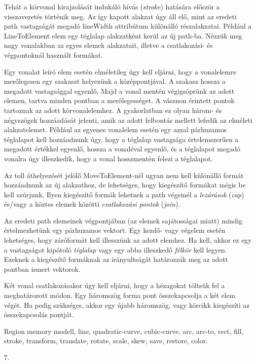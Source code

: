 \documentclass[12pt]{report}
\theoremstyle{definition}
\newcommand{\inenglish}[1]{\textsl{#1}}
\newcommand{\func}[1]{{\textsf{\footnotesize{#1}}}}
\begin{document}
Tehát a körvonal kirajzolását indukáló hívás (\emph{stroke}) hatására először a
visszavezetés történik meg. Az így kapott alakzat úgy áll elő, mint az eredeti
path vastagságát megadó \func{lineWidth} attribútum különálló részalakzatai.
Például a \func{LineToElement} elem egy téglalap alakzatként kerül az új
path-ba. Nézzük meg nagy vonalakban az egyes elemek alakzatait, illetve a
csatlakozási- és végpontoknál használt formákat.

Egy vonalat leíró elem esetén elméletileg úgy kell eljárni, hogy a vonalelemre
merőlegesen egy szakaszt helyezünk a középpontjával. A szakasz hossza a
megadott vastagsággal egyenlő. Majd a vonal mentén végigsöprünk az adott
elemen, tartva minden pontban a merőlegességet. A vásznon érintett pontok
tartoznak az adott körvonalelemhez. A gyakorlatban ez olyan három- és
négyszögek hozzáadását jelenti, amik az adott felbontás mellett lefedik az
elméleti alakzatelemet.  Például az egyenes vonalelem esetén egy azzal
párhuzamos téglalapot kell hozzáadnunk úgy, hogy a téglalap vastagsága
értelemszerűen a megadott értékkel egyenlő, hossza a vonaléval egyenlő, és a
téglalapot megadó vonalra úgy illeszkedik, hogy a vonal hosszmentén felezi a
téglalapot.

Az toll áthelyezését jelölő \func{MoveToElement}-nél ugyan nem kell különálló
formát hozzáadnunk az új alakzathoz, de lehetséges, hogy kiegészítő formákat
mégis be kell szúrjunk. Ilyen kiegészítő formák lehetnek a path végeinél a
\emph{lezárások} (\inenglish{cap}) és/vagy a köztes elemek közötti
\emph{csatlakozási pontok} (\inenglish{join}).

Az eredeti path elemeinek végpontjában (az elemek sajátosságai miatt) mindig
értelmezhetünk egy párhuzamos vektort. Egy kezdő- vagy végelem esetén
lehetséges, hogy záróformát kell illesszünk az adott elemhez. Ha kell, akkor ez
egy a vastagságot kipótoló \emph{téglalap} vagy egy abba illeszkedő
\emph{félkör} kell legyen. Ezeknek a kiegészítő formáknak az irányultságát
határozzák meg az adott pontban ismert vektorok.

Két vonal csatlakozásakor úgy kell eljárni, hogy a hézagokat töltsük fel a
meghatározott módon. Egy háromszög forma pont összekapcsolja a két elem végét.
Ha pedig szükséges, akkor egy újabb háromszög, vagy körcikk kiegészíti az
összekapcsolás pontját.

  \begin{description}[noitemsep]
    \item[Kulcsszavak] Region memory modell, line, quadratic-curve,
    cubic-curve, arc, arc-to, rect, fill, stroke, transform, translate, rotate,
    scale, skew, save, restore, color.
    \item[Becsült oldalszám] 7.
  \end{description}
\end{document}
